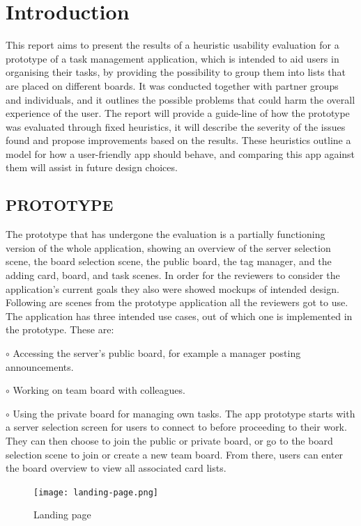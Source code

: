 \section{Introduction}

This report aims to present the results of a heuristic usability evaluation for a prototype of a task management application, which is intended to aid users in organising their tasks, by providing the possibility to group them into lists that are placed on different boards. It was conducted together with partner groups and individuals, and it outlines the possible problems that could harm the overall experience of the user. The report will provide a guide-line of how the prototype was evaluated through fixed heuristics, it will describe the severity of the issues found and propose improvements based on the results. These heuristics outline a model for how a user-friendly app should behave, and comparing this app against them will assist in future design choices.

\graphicspath{{huereport/content/images/}}
\subsection{PROTOTYPE}
 The prototype that has undergone the evaluation is a partially functioning version of the whole application, showing an overview of the server selection scene, the board selection scene, the public board, the tag manager, and the adding card, board, and task scenes. In order for the reviewers to consider the application's current goals they also were showed mockups of intended design. Following are scenes from the prototype application all the reviewers got to use. The application has three intended use cases, out of which one is implemented in the prototype. These are:

\(\circ \) Accessing the server's public board, for example a manager posting announcements.

\(\circ \) Working on team board with colleagues.

\(\circ \) Using the private board for managing own tasks.
\newline
The app prototype starts with a server selection screen for users to connect to before proceeding to their work. They can then choose to join the public or private board, or go to the board selection scene to join or create a new team board. From there, users can enter the board overview to view all associated card lists.
\begin{figure}[H]
    \centering
    \texttt{[image: landing-page.png]}
    \caption{Landing page}
    \label{fig:landing}
\end{figure}

